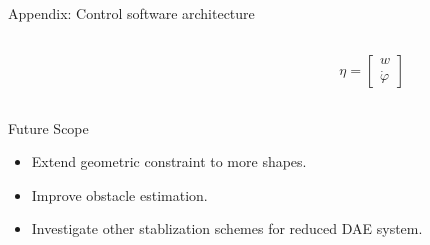 \documentclass[10pt,aspectratio=1610]{beamer} %
\begin{document}
\begin{frame}{Appendix: Control software architecture}
	\begin{columns}[onlytextwidth]
	\begin{column}{0.95\textwidth}
	\begin{center}
		\def\svgwidth{0.85\textwidth}
		
		\end{center}

	\end{column}

	\begin{column}{0.05\textwidth}
		\begin{align*}
			\eta =\begin{bmatrix}
				w\\
				\dot{\varphi}
			\end{bmatrix} 
		\end{align*}
	\end{column}
\end{columns}
\end{frame}

\begin{frame}{Future Scope}
	\begin{itemize}[label=\textbullet]
	\item Extend geometric constraint to more shapes.
	\item Improve obstacle estimation.  
	\item Investigate other stablization schemes for reduced DAE system.
	\end{itemize}
\end{frame}
\end{document}
